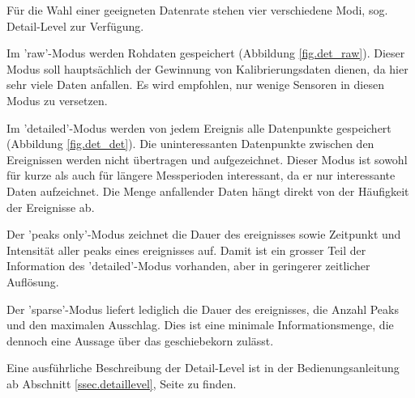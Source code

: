 Für die Wahl einer geeigneten Datenrate stehen vier verschiedene Modi, sog. Detail-Level zur Verfügung. 

Im 'raw'-Modus werden Rohdaten gespeichert (Abbildung \ref{fig.det_raw}). Dieser Modus soll hauptsächlich der Gewinnung von Kalibrierungsdaten dienen, da hier sehr viele Daten anfallen. Es wird empfohlen, nur wenige Sensoren in diesen Modus zu versetzen.

Im 'detailed'-Modus werden von jedem Ereignis alle Datenpunkte gespeichert (Abbildung \ref{fig.det_det}). Die uninteressanten Datenpunkte zwischen den Ereignissen werden nicht übertragen und aufgezeichnet. Dieser Modus ist sowohl für kurze als auch für längere Messperioden interessant, da er nur interessante Daten aufzeichnet. Die Menge anfallender Daten hängt direkt von der Häufigkeit der Ereignisse ab.

Der 'peaks only'-Modus zeichnet die Dauer des \gls{ereignis}ses sowie Zeitpunkt und Intensität aller \gls{peak}s eines \gls{ereignis}ses auf. Damit ist ein grosser Teil der Information des 'detailed'-Modus vorhanden, aber in geringerer zeitlicher Auflösung.

Der 'sparse'-Modus liefert lediglich die Dauer des \gls{ereignis}ses, die Anzahl Peaks und den maximalen Ausschlag. Dies ist eine minimale Informationsmenge, die dennoch eine Aussage über das \gls{geschiebekorn} zulässt.

Eine ausführliche Beschreibung der Detail-Level ist in der Bedienungsanleitung ab Abschnitt \ref{ssec.detaillevel}, Seite \pageref{ssec.detaillevel} zu finden.

